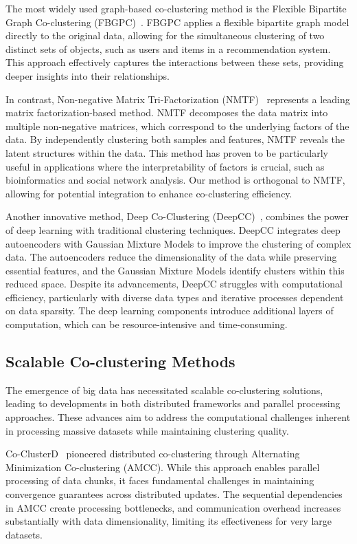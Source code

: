 \documentclass[journal]{IEEEtran}
\theoremstyle{definition}
\theoremstyle{remark} %
\renewcommand{\cite}[1]{~\autocite{#1}}
\begin{document}
The most widely used graph-based co-clustering method is the Flexible Bipartite Graph Co-clustering (FBGPC)\cite{chen2023FastFlexibleBipartitea}. FBGPC applies a flexible bipartite graph model directly to the original data, allowing for the simultaneous clustering of two distinct sets of objects, such as users and items in a recommendation system. This approach effectively captures the interactions between these sets, providing deeper insights into their relationships.

In contrast, Non-negative Matrix Tri-Factorization (NMTF)\cite{long2005CoclusteringBlockValue} represents a leading matrix factorization-based method. NMTF decomposes the data matrix into multiple non-negative matrices, which correspond to the underlying factors of the data. By independently clustering both samples and features, NMTF reveals the latent structures within the data. This method has proven to be particularly useful in applications where the interpretability of factors is crucial, such as bioinformatics and social network analysis. Our method is orthogonal to NMTF, allowing for potential integration to enhance co-clustering efficiency.

Another innovative method, Deep Co-Clustering (DeepCC)\cite{dongkuanxu2019DeepCoClustering}, combines the power of deep learning with traditional clustering techniques. DeepCC integrates deep autoencoders with Gaussian Mixture Models to improve the clustering of complex data. The autoencoders reduce the dimensionality of the data while preserving essential features, and the Gaussian Mixture Models identify clusters within this reduced space. Despite its advancements, DeepCC struggles with computational efficiency, particularly with diverse data types and iterative processes dependent on data sparsity. The deep learning components introduce additional layers of computation, which can be resource-intensive and time-consuming.

\subsection{Scalable Co-clustering Methods}
The emergence of big data has necessitated scalable co-clustering solutions, leading to developments in both distributed frameworks and parallel processing approaches. These advances aim to address the computational challenges inherent in processing massive datasets while maintaining clustering quality.

Co-ClusterD\cite{cheng2015CoClusterDDistributedFramework} pioneered distributed co-clustering through Alternating Minimization Co-clustering (AMCC). While this approach enables parallel processing of data chunks, it faces fundamental challenges in maintaining convergence guarantees across distributed updates. The sequential dependencies in AMCC create processing bottlenecks, and communication overhead increases substantially with data dimensionality, limiting its effectiveness for very large datasets.
\end{document}
